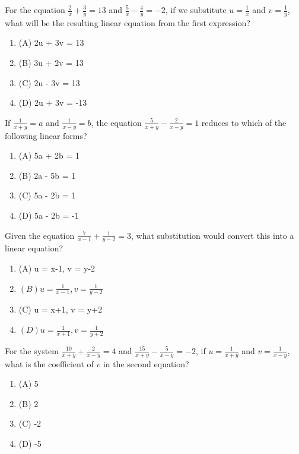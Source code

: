 \documentclass[12pt,a4paper]{exam}
\begin{document}
\begin{questions}
\question[1] For the equation $\frac{2}{x} + \frac{3}{y} = 13$ and $\frac{5}{x} - \frac{4}{y} = -2$, if we substitute $u = \frac{1}{x}$ and $v = \frac{1}{y}$, what will be the resulting linear equation from the first expression?
\begin{enumerate}[label=(\Alph*)]
  \item (A) 2u + 3v = 13
  \item (B) 3u + 2v = 13
  \item (C) 2u - 3v = 13
  \item (D) 2u + 3v = -13
\end{enumerate}
\vspace{0.15cm}

\question[1] If $\frac{1}{x+y} = a$ and $\frac{1}{x-y} = b$, the equation $\frac{5}{x+y} - \frac{2}{x-y} = 1$ reduces to which of the following linear forms?
\begin{enumerate}[label=(\Alph*)]
  \item (A) 5a + 2b = 1
  \item (B) 2a - 5b = 1
  \item (C) 5a - 2b = 1
  \item (D) 5a - 2b = -1
\end{enumerate}
\vspace{0.15cm}

\question[1] Given the equation $\frac{7}{x-1} + \frac{1}{y-2} = 3$, what substitution would convert this into a linear equation?
\begin{enumerate}[label=(\Alph*)]
  \item (A) u = x-1, v = y-2
  \item $(B) u = \frac{1}{x-1}, v = \frac{1}{y-2}$
  \item (C) u = x+1, v = y+2
  \item $(D) u = \frac{1}{x+1}, v = \frac{1}{y+2}$
\end{enumerate}
\vspace{0.15cm}

\question[1] For the system $\frac{10}{x+y} + \frac{2}{x-y} = 4$ and $\frac{15}{x+y} - \frac{5}{x-y} = -2$, if $u = \frac{1}{x+y}$ and $v = \frac{1}{x-y}$, what is the coefficient of $v$ in the second equation?
\begin{enumerate}[label=(\Alph*)]
  \item (A) 5
  \item (B) 2
  \item (C) -2
  \item (D) -5
\end{enumerate}
\vspace{0.15cm}


\end{questions}
\end{document}
